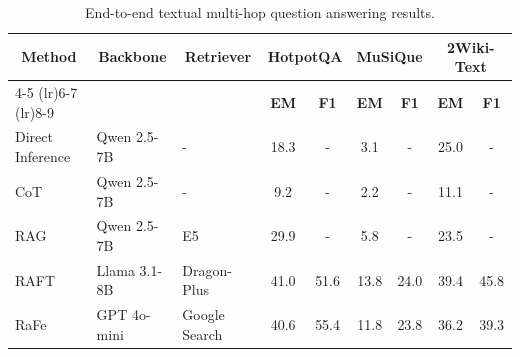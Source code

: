\begin{table}[h!]
\centering
\caption{End-to-end textual multi-hop question answering results. 
}
\begin{tabular}{lllcccccc}
\toprule
\multicolumn{1}{c}{\multirow{2}{*}{\textbf{Method}}} & \multicolumn{1}{c}{\multirow{2}{*}{\textbf{Backbone}}} & \multicolumn{1}{c}{\multirow{2}{*}{\textbf{Retriever}}} & \multicolumn{2}{c}{\textbf{HotpotQA}}  & \multicolumn{2}{c}{\textbf{MuSiQue}}   & \multicolumn{2}{c}{\textbf{2Wiki-Text}}      \\
\cmidrule(lr){4-5} \cmidrule(lr){6-7} \cmidrule(lr){8-9} 
\multicolumn{1}{c}{}                        & \multicolumn{1}{c}{}                          & \multicolumn{1}{c}{}                           & \textbf{EM}            & \textbf{F1}            & \textbf{EM}            & \textbf{F1}            & \textbf{EM}             & \textbf{F1}            \\
\midrule
Direct Inference                            & Qwen 2.5-7B                                   & - & 18.3 & - & 3.1 & - & 25.0 & - \\
CoT & Qwen 2.5-7B & - & 9.2 & - & 2.2 & - & 11.1 & - \\
RAG                                         & Qwen 2.5-7B                                   & E5                                     &  29.9  & -                               & 5.8    & -                          & 23.5      & -                         \\
RAFT                                       & Llama 3.1-8B                                  & Dragon-Plus                                    & 41.0                      & 51.6                            & 13.8                       & 24.0                       & 39.4                          & 45.8                      \\
RaFe                                        & GPT 4o-mini                                   & Google Search                                  & 40.6                      & 55.4                            & 11.8                       & 23.8                       & 36.2                          & 39.3                      \\

\end{tabular}
\end{table}
